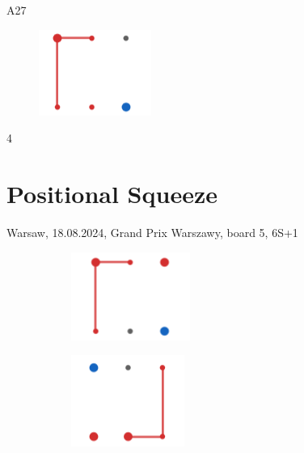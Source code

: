 \documentclass[14pt, a4paper]{extreport}
\begin{document}
        {}
        {}
        {}
        {}
\hspace{6.1cm}\clubs{}A\hspace{0.4cm}\clubs{}2\hspace{0.4cm}\diams{}7 
\vspace{-0.4cm}
\begin{figure}[H]
    \centering
    \includegraphics[scale=0.7]{./squeezes/automatic.png}
\end{figure}
\vspace{-0.9cm}
\hspace{6.1cm}\clubs{}4\hspace{0.4cm}\hspace{0.4cm} 

\vspace{-3cm}
\hspace{10cm}

\vspace{-0.2cm}
\hspace{10cm}

\newpage
\section*{Positional Squeeze}

Warsaw, 18.08.2024, Grand Prix Warszawy, board 5, 6\ntx{}S+1

\vspace{0.7cm}
\begin{figure}[H]
    \centering
    \begin{subfigure}{0.4\textwidth}
        \centering
        \includegraphics[scale=0.7]{./squeezes/positional.png}
    \end{subfigure}
    \begin{subfigure}{0.4\textwidth}
        \centering
        \includegraphics[scale=0.7]{./squeezes/positional_reverted.png}
    \end{subfigure}
\end{figure}
\end{document}
